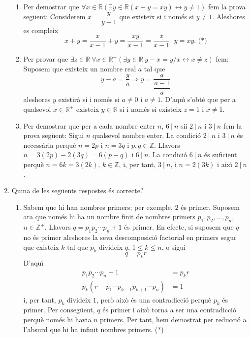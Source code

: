 \begin{enumerate}
\begin{enumerate}
\item Per demostrar que $\forall x\in\mathbb{R}\left(  \exists y\in
\mathbb{R}(x+y=xy)\leftrightarrow y\neq1\right)  $ fem la prova seg\"{u}ent:
Considerem $x=\dfrac{y}{y-1}$ que existeix si i nom\'{e}s si $y\neq1$.
Aleshores es compleix%
\[
x+y=\dfrac{x}{x-1}+y=\frac{xy}{x-1}=\frac{x}{x-1}\cdot y=xy\text{. (*)}%
\]


\item Per provar que $\exists z\in\mathbb{R~}\forall x\in\mathbb{R}^{+}\left(
\exists y\in\mathbb{R~}y-x=y/x\longleftrightarrow x\neq z\right)  $ fem:
Suposem que existeix un nombre real $a$ tal que
\[
y-a=\frac{y}{a}\Longrightarrow y=\dfrac{a}{\dfrac{a-1}{a}}%
\]
aleshores $y$ existir\`{a} si i nom\'{e}s si $a\neq0$ i $a\neq1$. D'aqu\'{\i}
s'obt\'{e} que per a qualsevol $x\in\mathbb{R}^{+}$ existeix $y\in\mathbb{R}$
si i nom\'{e}s si existeix $z=1$ i $x\neq1$.

\item Per demostrar que per a cada nombre enter $n$, $6~|~n$ sii $2~|~n$ i
$3~|~n$ fem la prova seg\"{u}ent: Sigui $n$ qualsevol nombre enter. La
condici\'{o} $2~|~n$ i $3~|~n$ \'{e}s necess\`{a}ria perqu\`{e} $n=2p$ i
$n=3q$ i $p,q\in\mathbb{Z}$. Llavors $n=3\left(  2p\right)  -2\left(
3q\right)  =6\left(  p-q\right)  $ i $6~|~n$. La condici\'{o} $6~|~n$ \'{e}s
suficient perqu\`{e} $n=6k=3(2k)$, $k\in\mathbb{Z}$, i, per tant, $3~|~n$, i
$n=2\left(  3k\right)  $ i aix\'{\i} $2~|~n$.
\end{enumerate}

\item Quina de les seg\"{u}ents respostes \'{e}s correcte?

\begin{enumerate}
\item Sabem que hi han nombres primers; per exemple, $2$ \'{e}s primer.
Suposem ara que nom\'{e}s hi ha un nombre finit de nombres primers
$p_{1},p_{2},...,p_{n}$, $n\in\mathbb{Z}^{+}$. Llavors $q=p_{1}p_{2}\cdots
p_{n}+1$ \'{e}s primer. En efecte, si suposem que $q$ no \'{e}s primer
aleshores la seva descomposici\'{o} factorial en primers segur que existeix
$k$ tal que $p_{k}$ divideix $q$, $1\leq k\leq n$, o sigui%
\[
q=p_{k}r
\]
D'aqu\'{\i}%
\begin{align*}
p_{1}p_{2}\cdots p_{n}+1 &  =p_{k}r\\
p_{k}\left(  r-p_{1}\cdots p_{k-1}p_{k+1}\cdots p_{n}\right)   &  =1
\end{align*}
i, per tant, $p_{k}$ divideix $1$, per\`{o} aix\`{o} \'{e}s una
contradicci\'{o} perqu\`{e} $p_{k}$ \'{e}s primer. Per conseg\"{u}ent, $q$
\'{e}s primer i aix\`{o} torna a ser una contradicci\'{o} perqu\`{e} nom\'{e}s
hi havia $n$ primers. Per tant, hem demostrat per reducci\'{o} a l'absurd que
hi ha infinit nombres primers. (*)


\end{enumerate}
\end{enumerate}
